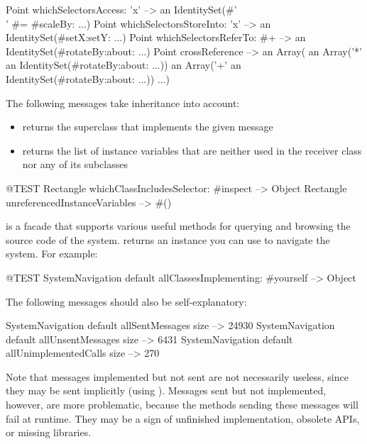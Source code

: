 \documentclass[a4paper,10pt,twoside]{book}
\begin{document}
\begin{code}{} %
Point whichSelectorsAccess: 'x'    --> an IdentitySet(#'\\' #= #scaleBy: ...)
Point whichSelectorsStoreInto: 'x' --> an IdentitySet(#setX:setY: ...)
Point whichSelectorsReferTo: #+  --> an IdentitySet(#rotateBy:about: ...)
Point crossReference --> an Array(
		an Array('*' an IdentitySet(#rotateBy:about: ...))
		an Array('+' an IdentitySet(#rotateBy:about: ...))
		...)
\end{code}

The following messages take inheritance into account:
\begin{itemize}
\item {} returns the superclass that implements the given message
\item {} returns the list of instance variables that are neither used in the receiver class nor any of its subclasses
\end{itemize}

\begin{code}{@TEST}
Rectangle whichClassIncludesSelector: #inspect --> Object
Rectangle unreferencedInstanceVariables            --> #()
\end{code}

 is a facade that supports various useful methods for querying and browsing the source code of the system.
  returns an instance you can use to navigate the system.
For example:

\begin{code}{@TEST}
SystemNavigation default allClassesImplementing: #yourself --> {Object}
\end{code}

The following messages should also be self-explanatory:

\begin{code}{}
SystemNavigation default allSentMessages size          --> 24930
SystemNavigation default allUnsentMessages size      --> 6431
SystemNavigation default allUnimplementedCalls size --> 270
\end{code}

Note that messages implemented but not sent are not necessarily useless, since they may be sent implicitly (\eg using ).
Messages sent but not implemented, however, are more problematic, because the methods sending these messages will fail at runtime.
They may be a sign of unfinished implementation, obsolete APIs, or missing libraries.
\end{document}
